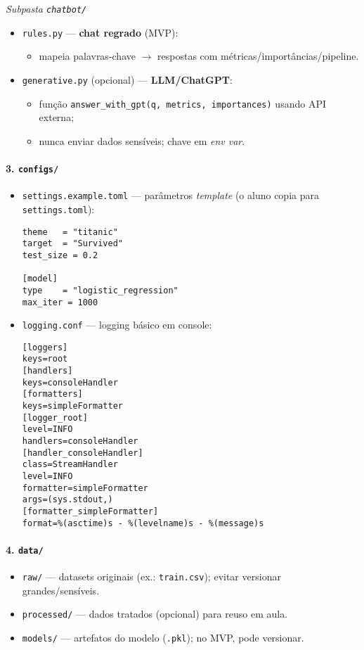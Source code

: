 \documentclass[12pt,a4paper]{article}
\begin{document}
\emph{Subpasta \texttt{chatbot/}}
\begin{itemize}
  \item \texttt{rules.py} --- \textbf{chat regrado} (MVP):
  \begin{itemize}
    \item mapeia palavras-chave $\rightarrow$ respostas com métricas/importâncias/pipeline.
  \end{itemize}
  \item \texttt{generative.py} (opcional) --- \textbf{LLM/ChatGPT}:
  \begin{itemize}
    \item função \texttt{answer\_with\_gpt(q, metrics, importances)} usando API externa;
    \item nunca enviar dados sensíveis; chave em \textit{env var}.
  \end{itemize}
\end{itemize}

\paragraph{3. \texttt{configs/}}
\begin{itemize}
  \item \texttt{settings.example.toml} --- parâmetros \emph{template} (o aluno copia para \texttt{settings.toml}):
\begin{lstlisting}
theme   = "titanic"
target  = "Survived"
test_size = 0.2

[model]
type    = "logistic_regression"
max_iter = 1000
\end{lstlisting}
  \item \texttt{logging.conf} --- logging básico em console:
\begin{lstlisting}
[loggers]
keys=root
[handlers]
keys=consoleHandler
[formatters]
keys=simpleFormatter
[logger_root]
level=INFO
handlers=consoleHandler
[handler_consoleHandler]
class=StreamHandler
level=INFO
formatter=simpleFormatter
args=(sys.stdout,)
[formatter_simpleFormatter]
format=%(asctime)s - %(levelname)s - %(message)s
\end{lstlisting}
\end{itemize}

\paragraph{4. \texttt{data/}}
\begin{itemize}
  \item \texttt{raw/} --- datasets originais (ex.: \texttt{train.csv}); evitar versionar grandes/sensíveis.
  \item \texttt{processed/} --- dados tratados (opcional) para reuso em aula.
  \item \texttt{models/} --- artefatos do modelo (\texttt{.pkl}); no MVP, pode versionar.
\end{itemize}
\end{document}
